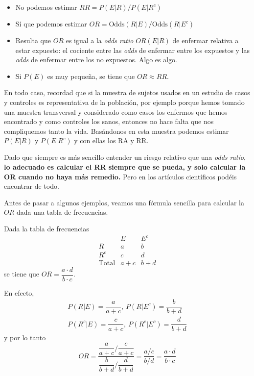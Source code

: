 \documentclass[
]{book}
\theoremstyle{definition}
\theoremstyle{definition}
\theoremstyle{definition}
\theoremstyle{definition}
\theoremstyle{remark}
\begin{document}
\begin{itemize}
\item
  No podemos estimar \(RR=P(E|R)/P(E|R^c)\)
\item
  Sí que podemos estimar \(OR=\text{Odds}(R|E)/\text{Odds}(R|E^c)\)
\item
  Resulta que \(OR\) es igual a la \emph{odds ratio} \(OR(E|R)\) de enfermar relativa a estar expuesto: el cociente entre las \emph{odds} de enfermar entre los expuestos y las \emph{odds} de enfermar entre los no expuestos. Algo es algo.
\item
  Si \(P(E)\) es muy pequeña, se tiene que \(OR\approx RR\).
\end{itemize}

En todo caso, recordad que si la muestra de sujetos usados en un estudio de casos y controles es representativa de la población, por ejemplo porque hemos tomado una muestra transversal y considerado como casos los enfermos que hemos encontrado y como controles los sanos, entonces no hace falta que nos compliquemos tanto la vida. Basándonos en esta muestra podemos estimar \(P(E|R)\) y \(P(E|R^c)\) y con ellas los RA y RR.

Dado que siempre es más sencillo entender un riesgo relativo que una \emph{odds ratio}, \textbf{lo adecuado es calcular el RR siempre que se pueda, y solo calcular la OR cuando no haya más remedio.} Pero en los artículos científicos podéis encontrar de todo.

Antes de pasar a algunos ejemplos, veamos una fórmula sencilla para calcular la \(OR\) dada una tabla de frecuencias.

\begin{rmdimportant}
Dada la tabla de frecuencias
\[
\begin{array}{c|cc}
        & E & E^c \\ \hline
R & a & b   \\ 
R^c & c & d\\ \hline
\text{Total} & a+c & b+d
 \end{array}
\]
se tiene que \(OR=\dfrac{a\cdot d}{b\cdot c}\).
\end{rmdimportant}

En efecto,
\[
\begin{array}{l}
P(R|E)=\dfrac{a}{a+c},\ P(R|E^c)=\dfrac{b}{b+d}\\
P(R^c|E)=\dfrac{c}{a+c},\ P(R^c|E^c)=\dfrac{d}{b+d}
\end{array}
\]
y por lo tanto
\[
OR=\frac{\dfrac{a}{a+c}\Big/\dfrac{c}{a+c}}{\dfrac{b}{b+d}\Big/\dfrac{d}{b+d}}=\frac{a/c}{b/d}=\frac{a\cdot d}{b\cdot c}
\]
\end{document}
